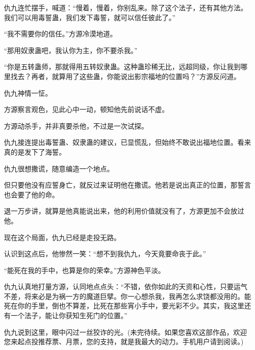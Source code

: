 \begin{this_body}
仇九连忙摆手，喊道：“慢着，慢着，你别乱来。除了这个法子，还有其他方法。我们可以用毒誓蛊，我们发下毒誓，就可以信任彼此了。”

“我不需要你的信任。”方源冷漠地道。

“那用奴隶蛊吧，我认你为主，你不要杀我。”

“你是五转蛊师，那就得用五转奴隶蛊。这种蛊珍稀无比，远超同级，你让我到哪里找去？再者，就算用了这些蛊，你能说出影宗福地的位置吗？”方源反问道。

仇九神情一怔。

方源察言观色，见此心中一动，顿知他先前说话不虚。

方源动杀手，并非真要杀他，不过是一次试探。

仇九接连提出毒誓蛊、奴隶蛊的建议，已显慌乱，但始终不敢说出福地位置。看来真的是发下了海誓。

仇九很想撒谎，随意编造一个地点。

但只要他没有应誓身亡，就反过来证明他在撒谎。他若是说出真正的位置，那誓言也会要了他的命。

退一万步讲，就算是他真能说出来，他的利用价值就没有了，方源更加不会放过他。

现在这个局面，仇九已经是走投无路。

认识到这点后，他惨然一笑：“想不到我仇九，今天竟要命丧于此。”

“能死在我的手中，也算是你的荣幸。”方源神色平淡。

仇九认真地打量方源，认同地点点头：“不错，依你如此的天资和心性，只要运气不差，将来必是为祸一方的魔道巨擘。你一心想杀我，我再怎么求饶都没用的。能死在你的手里，倒也不算差，比死在那些宵小手中，要光彩不少。其实，我这里还有一个法子，能让你获知生死门的位置。”

仇九说到这里，眼中闪过一丝狡诈的光。(未完待续。如果您喜欢这部作品，欢迎您来起点投推荐票、月票，您的支持，就是我最大的动力。手机用户请到阅读。)

\end{this_body}

